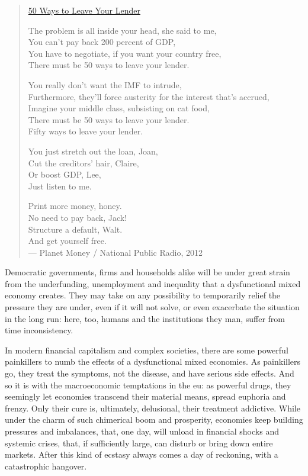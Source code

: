\begin{verse}
	\href{http://www.npr.org/blogs/money/2012/03/01/147720368/50-ways-to-leave-your-lender}{50 Ways to Leave Your Lender}

	The problem is all inside your head, she said to me,\\
	You can't pay back 200 percent of GDP,\\
	You have to negotiate, if you want your country free,\\
	There must be 50 ways to leave your lender.

	You really don't want the IMF to intrude,\\
	Furthermore, they'll force austerity for the interest that's accrued,\\
	Imagine your middle class, subsisting on cat food,\\
	There must be 50 ways to leave your lender.\\
	Fifty ways to leave your lender.

	You just stretch out the loan, Joan,\\
	Cut the creditors' hair, Claire,\\
	Or boost GDP, Lee,\\
	Just listen to me.

	Print more money, honey.\\
	No need to pay back, Jack!\\
	Structure a default, Walt.\\
	And get yourself free.\\
	--- Planet Money / National Public Radio, 2012
\end{verse}

Democratic governments, firms and households alike will be under great strain from the underfunding, unemployment and inequality that a dysfunctional mixed economy creates.
They may take on any possibility to temporarily relief the pressure they are under, even if it will not solve, or even exacerbate the situation in the long run:
here, too, humans and the institutions they man, suffer from time inconsistency.

In modern financial capitalism and complex societies, there are some powerful painkillers to numb the effects of a dysfunctional mixed economies.
As painkillers go, they treat the symptoms, not the disease, and have serious side effects.
And so it is with the macroeconomic temptations in the \gls{eu}:
as powerful drugs, they seemingly let economies transcend their material means, spread euphoria and frenzy.
Only their cure is, ultimately, delusional, their treatment addictive.
While under the charm of such chimerical boom and prosperity, economies keep building pressures and imbalances, that, one day, will unload in financial shocks and systemic crises, that, if sufficiently large, can disturb or bring down entire markets.
After this kind of ecstasy always comes a day of reckoning, with a catastrophic hangover.

